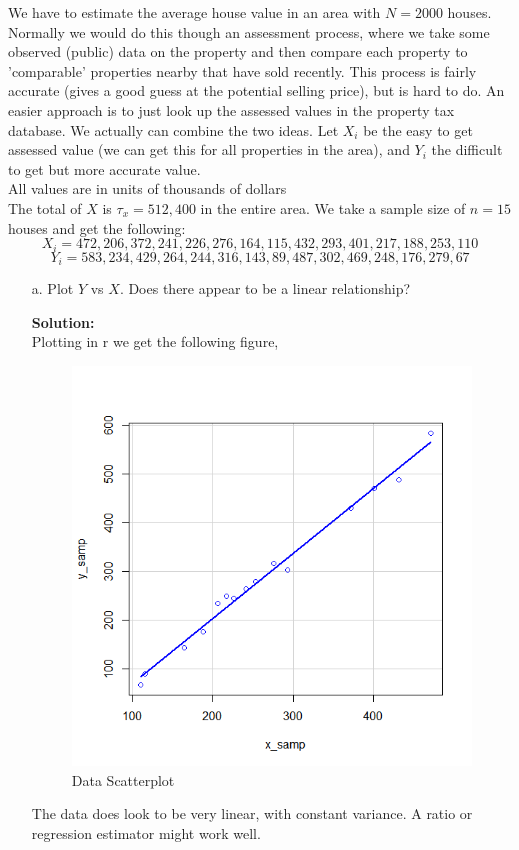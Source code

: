 \documentclass[12pt]{article}
\makeatletter
\theoremstyle{homework}
\newenvironment{exercise}[1]
{\def\@currentlabel{#1}\exercisecore}
{\endexercisecore}
\newcommand{\localhead}[1]{\par\smallskip\noindent\textbf{#1}\nobreak\\}%
\newcommand\solution{\localhead{Solution:}}
\makeatother
\begin{document}
\begin{exercise}{1}We have to estimate the average house value in an area with $N = 2000$ houses. Normally we would do this though an assessment process, 
    where we take some observed (public) data on the property and then compare each property to 'comparable' properties nearby that have sold recently. 
    This process is fairly accurate (gives a good guess at the potential selling price), but is hard to do. An easier approach is to just look 
    up the assessed values in the property tax database. We actually can combine the two ideas. Let $X_i$ be the easy to get assessed value 
    (we can get this for all properties in the area), and $Y_i$ the difficult to get but more accurate value.\\

    All values are in units of thousands of dollars\\

    The total of $X$ is $\tau_x = 512,400$ in the entire area. We take a sample size of $n = 15$ houses and get the following:\\
    \begin{equation*}
        X_i = 472,206,372,241,226,276,164,115,432,293,401,217,188,253,110
    \end{equation*}
    \begin{equation*}
        Y_i = 583,234,429,264,244,316,143,89,487,302,469,248,176,279,67
    \end{equation*}
    \begin{enumerate}
        \item[a.] Plot $Y$ vs $X$. Does there appear to be a linear relationship?\\
        \solution Plotting in r we get the following figure, 
        \begin{figure}[H]
          \begin{center}
          \caption{Data Scatterplot}
          \includegraphics[width = .65\textwidth]{Rplot.png}
          \end{center}
        \end{figure}
        The data does look to be very linear, with constant variance. A ratio or regression estimator might work well. 
        \vspace{.15in}


\end{enumerate}
\end{exercise}
\end{document}

